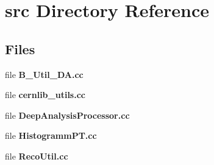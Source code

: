 \section{src Directory Reference}
\label{dir_0812a4a0c721a49e1d8c6df71503c952}
\subsection*{Files}
\begin{DoxyCompactItemize}
\item 
file {\bfseries B\-\_\-\-Util\-\_\-\-D\-A.\-cc}
\item 
file {\bfseries cernlib\-\_\-utils.\-cc}
\item 
file {\bfseries Deep\-Analysis\-Processor.\-cc}
\item 
file {\bfseries Histogramm\-P\-T.\-cc}
\item 
file {\bfseries Reco\-Util.\-cc}
\end{DoxyCompactItemize}
